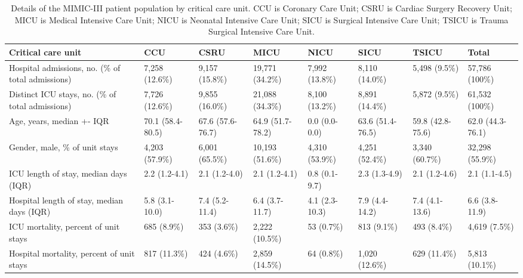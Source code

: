\documentclass[english]{article}
\begin{document}
\begin{center}
\begin{table}
\begin{tabular}{|p{1.8cm}|p{1.2cm}|p{1.2cm}|p{1.2cm}|p{1.2cm}|p{1.2cm}|p{1.2cm}|p{1.2cm}|}
    \hline
    Critical care unit & CCU & CSRU & MICU & NICU & SICU & TSICU & Total \\ 
    \hline
    Hospital admissions, no. (\% of total admissions) & 7,258 (12.6\%) & 9,157 (15.8\%) & 19,771 (34.2\%) & 7,992 (13.8\%) & 8,110 (14.0\%) & 5,498 (9.5\%) & 57,786 (100\%) \\ 
    \hline
    Distinct ICU stays, no. (\% of total admissions) & 7,726 (12.6\%) & 9,855 (16.0\%) & 21,088 (34.3\%) & 8,100 (13.2\%) & 8,891 (14.4\%) & 5,872 (9.5\%) & 61,532 (100\%) \\ 
    \hline
    Age, years, median +- IQR & 70.1 (58.4-80.5) & 67.6 (57.6-76.7) & 64.9 (51.7-78.2) & 0.0 (0.0-0.0) & 63.6 (51.4-76.5) & 59.8 (42.8-75.6) & 62.0 (44.3-76.1) \\ 
    \hline
    Gender, male, \% of unit stays & 4,203 (57.9\%) & 6,001 (65.5\%) & 10,193 (51.6\%) & 4,310 (53.9\%) & 4,251 (52.4\%) & 3,340 (60.7\%) & 32,298 (55.9\%) \\ 
    \hline
    ICU length of stay, median days (IQR) & 2.2 (1.2-4.1) & 2.1 (1.2-4.0) &  2.1 (1.2-4.1) & 0.8 (0.1-9.7) & 2.3 (1.3-4.9) & 2.1 (1.2-4.6) & 2.1 (1.1-4.5) \\ 
    \hline
    Hospital length of stay, median days (IQR) & 5.8 (3.1-10.0) & 7.4 (5.2-11.4) & 6.4 (3.7-11.7) & 4.1 (2.3-10.3) & 7.9 (4.4-14.2) & 7.4 (4.1-13.6) & 6.6 (3.8-11.9) \\
    \hline
    ICU mortality, percent of unit stays & 685 (8.9\%) & 353 (3.6\%) & 2,222 (10.5\%) & 53 (0.7\%) & 813 (9.1\%) & 493 (8.4\%) & 4,619 (7.5\%) \\ 
    \hline
    Hospital mortality, percent of unit stays & 817 (11.3\%) & 424 (4.6\%) & 2,859 (14.5\%) & 64 (0.8\%) &  1,020 (12.6\%) & 629 (11.4\%) & 5,813 (10.1\%) \\ 
    \hline
\end{tabular}
\caption{Details of the MIMIC-III patient population by critical care unit. CCU is Coronary Care Unit; CSRU is Cardiac Surgery Recovery Unit; MICU is Medical Intensive Care Unit; NICU is Neonatal Intensive Care Unit; SICU is Surgical Intensive Care Unit; TSICU is Trauma Surgical Intensive Care Unit.}
\label{table:patientpopulation}
\end{table}
\end{center}
\end{document}
